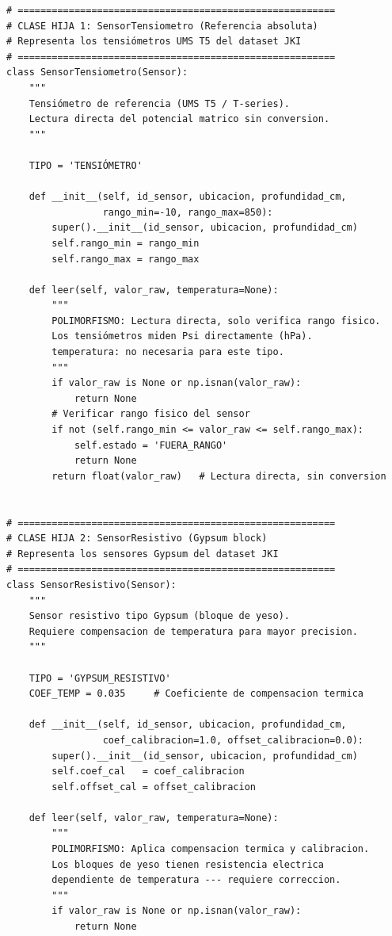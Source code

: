\documentclass[12pt,a4paper]{article}
\begin{document}
\begin{lstlisting}[caption={Jerarquía de clases \texttt{Sensor} con herencia y polimorfismo.}, label=lst:poo1]
# ========================================================
# CLASE HIJA 1: SensorTensiometro (Referencia absoluta)
# Representa los tensiómetros UMS T5 del dataset JKI
# ========================================================
class SensorTensiometro(Sensor):
    """
    Tensiómetro de referencia (UMS T5 / T-series).
    Lectura directa del potencial matrico sin conversion.
    """
    
    TIPO = 'TENSIÓMETRO'
    
    def __init__(self, id_sensor, ubicacion, profundidad_cm,
                 rango_min=-10, rango_max=850):
        super().__init__(id_sensor, ubicacion, profundidad_cm)
        self.rango_min = rango_min
        self.rango_max = rango_max
    
    def leer(self, valor_raw, temperatura=None):
        """
        POLIMORFISMO: Lectura directa, solo verifica rango fisico.
        Los tensiómetros miden Psi directamente (hPa).
        temperatura: no necesaria para este tipo.
        """
        if valor_raw is None or np.isnan(valor_raw):
            return None
        # Verificar rango fisico del sensor
        if not (self.rango_min <= valor_raw <= self.rango_max):
            self.estado = 'FUERA_RANGO'
            return None
        return float(valor_raw)   # Lectura directa, sin conversion


# ========================================================
# CLASE HIJA 2: SensorResistivo (Gypsum block)
# Representa los sensores Gypsum del dataset JKI
# ========================================================
class SensorResistivo(Sensor):
    """
    Sensor resistivo tipo Gypsum (bloque de yeso).
    Requiere compensacion de temperatura para mayor precision.
    """
    
    TIPO = 'GYPSUM_RESISTIVO'
    COEF_TEMP = 0.035     # Coeficiente de compensacion termica
    
    def __init__(self, id_sensor, ubicacion, profundidad_cm,
                 coef_calibracion=1.0, offset_calibracion=0.0):
        super().__init__(id_sensor, ubicacion, profundidad_cm)
        self.coef_cal   = coef_calibracion
        self.offset_cal = offset_calibracion
    
    def leer(self, valor_raw, temperatura=None):
        """
        POLIMORFISMO: Aplica compensacion termica y calibracion.
        Los bloques de yeso tienen resistencia electrica 
        dependiente de temperatura --- requiere correccion.
        """
        if valor_raw is None or np.isnan(valor_raw):
            return None
        

\end{lstlisting}
\end{document}
